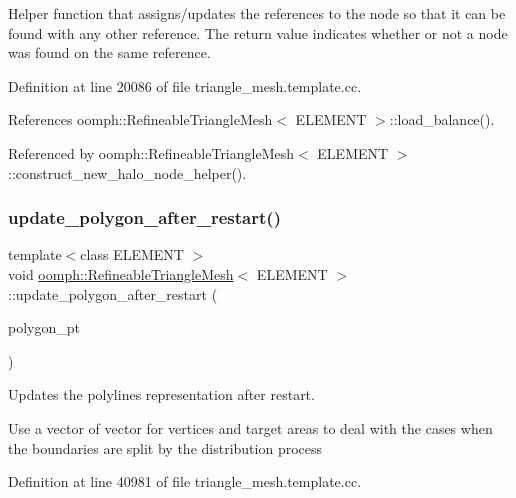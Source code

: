 Helper function that assigns/updates the references to the node so that it can be found with any other reference. The return value indicates whether or not a node was found on the same reference. 



Definition at line 20086 of file triangle\+\_\+mesh.\+template.\+cc.



References oomph\+::\+Refineable\+Triangle\+Mesh$<$ E\+L\+E\+M\+E\+N\+T $>$\+::load\+\_\+balance().



Referenced by oomph\+::\+Refineable\+Triangle\+Mesh$<$ E\+L\+E\+M\+E\+N\+T $>$\+::construct\+\_\+new\+\_\+halo\+\_\+node\+\_\+helper().

\mbox{\label{classoomph_1_1RefineableTriangleMesh_ae1046fa27f50e13ad7081408a341eb20}} 
\subsubsection{\texorpdfstring{update\+\_\+polygon\+\_\+after\+\_\+restart()}{update\_polygon\_after\_restart()}}
{\footnotesize\ttfamily template$<$class E\+L\+E\+M\+E\+NT $>$ \\
void \hyperlink{classoomph_1_1RefineableTriangleMesh}{oomph\+::\+Refineable\+Triangle\+Mesh}$<$ E\+L\+E\+M\+E\+NT $>$\+::update\+\_\+polygon\+\_\+after\+\_\+restart (\begin{DoxyParamCaption}\item[{Triangle\+Mesh\+Polygon $\ast$\&}]{polygon\+\_\+pt }\end{DoxyParamCaption})\hspace{0.3cm}{\ttfamily [protected]}}



Updates the polylines representation after restart. 

Use a vector of vector for vertices and target areas to deal with the cases when the boundaries are split by the distribution process 

Definition at line 40981 of file triangle\+\_\+mesh.\+template.\+cc.



